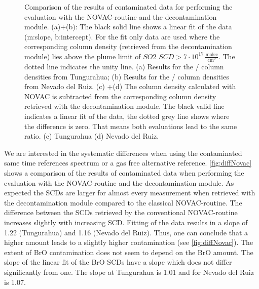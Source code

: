 \documentclass  [
  paper    = a4,
  BCOR     = 10mm,
  twoside,
  fontsize = 12pt,
  fleqn,
  toc      = bibnumbered,
  toc      = listofnumbered,
  numbers  = noendperiod,
  headings = normal,
  listof   = leveldown,
  version  = 3.03
]                                       {scrreprt}
\begin{document}
\begin{figure}[h!]
{		\label{fig:diffratiod}}
	\caption[Comparison of the results of contaminated data for performing the evaluation with the NOVAC-routine and the decontamination module. The results for the ratio of BrO/ are shown.]{Comparison of the results of contaminated data for performing the evaluation with the NOVAC-routine and the decontamination module.  (a)+(b): The black solid line shows a linear fit of the data (m:slope, b:intercept). For the fit only data are used where the corresponding   column density (retrieved from the decontamination module) lies above the plume limit of $SO2\_SCD>7\cdot 10^{17}\,\frac{\text{molec}}{\text{cm}^2}$. The dotted line indicates the unity line. (a) Results for the   /  column densities from Tungurahua; (b) Results for the   /  column densities from Nevado del Ruiz. 
		(c) +(d) The column density calculated with NOVAC is subtracted from the corresponding column density retrieved with the decontamination module. The black valid line indicates a linear fit of the data, the dotted grey line shows where the difference is zero. That means both evaluations lead to the same ratio. (c) Tungurahua (d) Nevado del Ruiz. }
	\label{fig:diffratio}
\end{figure}
	We are interested in the systematic differences when using the contaminated same time references spectrum or a gas free alternative reference.  
	\cref{fig:diffNovac} shows a comparison of the results of contaminated data when performing the evaluation with the NOVAC-routine and the decontamination module. 
	As expected the   SCDs  are larger for almost every measurement when retrieved with the decontamination module compared to the classical NOVAC-routine. The difference between the  SCDs retrieved by the conventional NOVAC-routine increases slightly with increasing  SCD. Fitting of the data results in a slope of 1.22 (Tungurahua) and 1.16 (Nevado del Ruiz). Thus, one can conclude that  a higher  amount leads to a slightly higher contamination (see \cref{fig:diffNovac}). The extent of BrO contamination does not seem to depend on the BrO amount. The slope of the linear fit of the BrO SCDs have a slope which does not differ significantly from one. The slope at Tungurahua is 1.01 and for Nevado del Ruiz  is 1.07. \\
\end{document}
